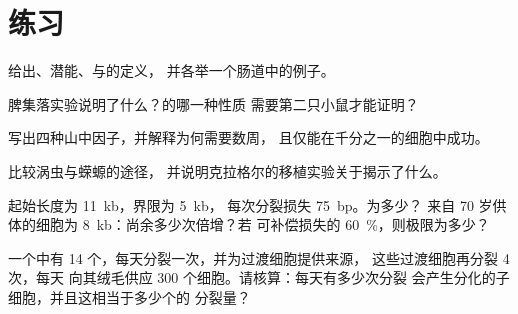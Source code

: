 \section{练习}

\begin{exercise}[$\star$]\label{exo:b3:stem-cells:1}
给出、潜能、与的定义，
并各举一个肠道中的例子。
\end{exercise}

\begin{exercise}[$\star$]\label{exo:b3:stem-cells:2}
脾集落实验说明了什么？的哪一种性质
需要第二只小鼠才能证明？
\end{exercise}

\begin{exercise}[$\star$]\label{exo:b3:stem-cells:3}
写出四种山中因子，并解释为何需要数周，
且仅能在千分之一的细胞中成功。
\end{exercise}

\begin{exercise}[$\star$]\label{exo:b3:stem-cells:4}
比较涡虫与蝾螈的途径，
并说明克拉格尔的移植实验关于揭示了什么。
\end{exercise}

\begin{exercise}[$\star\star$]\label{exo:b3:stem-cells:5}
起始长度为 \qty{11}{kb}，界限为 \qty{5}{kb}，
每次分裂损失 \qty{75}{bp}。为多少？
来自 70 岁供体的细胞为 \qty{8}{kb}：尚余多少次倍增？若
可补偿损失的 \qty{60}{\%}，则极限为多少？
\end{exercise}

\begin{exercise}[$\star\star$]\label{exo:b3:stem-cells:6}
一个中有 14 个，每天分裂一次，并为过渡细胞提供来源，
这些过渡细胞再分裂 4 次，每天
向其绒毛供应 \num{300} 个细胞。请核算：每天有多少次分裂
会产生分化的子细胞，并且这相当于多少个的
分裂量？
\end{exercise}

